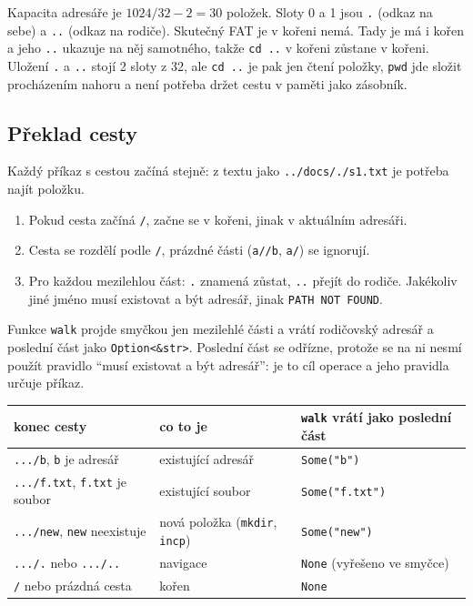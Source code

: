 \documentclass[10pt, a4paper]{report}
\newcommand{\code}[1]{\texttt{#1}}
\begin{document}
	Kapacita adresáře je $1024 / 32 - 2 = 30$ položek. Sloty 0 a 1 jsou \code{.} (odkaz na sebe) a
	\code{..} (odkaz na rodiče). Skutečný FAT je v kořeni nemá. Tady je má i kořen a jeho \code{..}
	ukazuje na něj samotného, takže \code{cd ..} v kořeni zůstane v kořeni. Uložení \code{.} a \code{..}
	stojí 2 sloty z 32, ale \code{cd ..} je pak jen čtení položky, \code{pwd} jde složit
	procházením nahoru a není potřeba držet cestu v paměti jako zásobník.
	
	\subsection{Překlad cesty}
	\label{sec:walk}
	
	Každý příkaz s cestou začíná stejně: z textu jako \code{../docs/./s1.txt} je potřeba najít
	položku.
	\begin{enumerate}
		\item Pokud cesta začíná \code{/}, začne se v kořeni, jinak v aktuálním adresáři.
		\item Cesta se rozdělí podle \code{/}, prázdné části (\code{a//b}, \code{a/}) se ignorují.
		\item Pro každou mezilehlou část: \code{.} znamená zůstat, \code{..} přejít do rodiče.
		Jakékoliv jiné jméno musí existovat a být adresář, jinak \code{PATH NOT FOUND}.
	\end{enumerate}
	
	Funkce \code{walk} projde smyčkou jen mezilehlé části a vrátí rodičovský adresář a poslední část
	jako \code{Option<\&str>}. Poslední část se odřízne, protože se na ni nesmí použít pravidlo
	\enquote{musí existovat a být adresář}: je to cíl operace a jeho pravidla určuje příkaz.
	
	\begin{table}[H]
		\centering
		\begin{tabular}{|l|l|l|}
			\hline
			\textbf{konec cesty} & \textbf{co to je} & \textbf{\code{walk} vrátí jako poslední část} \\ \hline
			\code{.../b}, \code{b} je adresář & existující adresář & \code{Some("b")} \\ \hline
			\code{.../f.txt}, \code{f.txt} je soubor & existující soubor & \code{Some("f.txt")} \\ \hline
			\code{.../new}, \code{new} neexistuje & nová položka (\code{mkdir}, \code{incp}) & \code{Some("new")} \\ \hline
			\code{.../.} nebo \code{.../..} & navigace & \code{None} (vyřešeno ve smyčce) \\ \hline
			\code{/} nebo prázdná cesta & kořen & \code{None} \\ \hline
		\end{tabular}
	\end{table}
	
\end{document}

